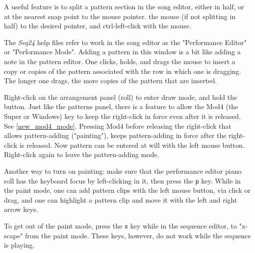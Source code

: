    A useful feature is to split a pattern section in the
   song editor, either in half, or at the nearest snap point to the mouse
   pointer.
   the mouse (if not splitting in half) to the desired pointer, and
   ctrl-left-click with the mouse.

   The \textsl{Seq24} help files refer to work in the song editor as the
   "Performance Editor" or "Performance Mode".  Adding a pattern in this
   window is a bit like adding a note in the pattern editor.
   One clicks, holds, and drags the mouse to insert a copy or copies of the
   pattern associated with the row in which one is dragging.
   The longer one drags, the more copies of the pattern that are inserted.

	Right-click on the arrangement panel (roll) to enter
   draw mode, and hold the button.
   Just like the patterns panel, there is a feature to allow the Mod4 (the
   Super or Windows) key to keep the right-click in force even after it is
   released.  See \ref{new_mod4_mode}.  Pressing Mod4 before
   releasing the right-click that allows pattern-adding ("painting"), keeps
   pattern-adding in force after the right-click is released.  Now pattern
   can be entered at will with the left mouse button.  Right-click again to
   leave the pattern-adding mode.

   Another way to turn on painting:
   make sure that the performance editor piano roll has the
   keyboard focus by left-clicking in it, then press the
   \texttt{p} key.
   While in the paint mode, one can add pattern clips with the left mouse
   button, via click or drag, and one can highlight a pattern clip and move it
   with the left and right arrow keys.


   To get out of the paint mode, press the
   \texttt{x} key while in the sequence editor, to "x-scape"
   from the paint mode.
   These keys, however, do not work while the sequence is playing.


